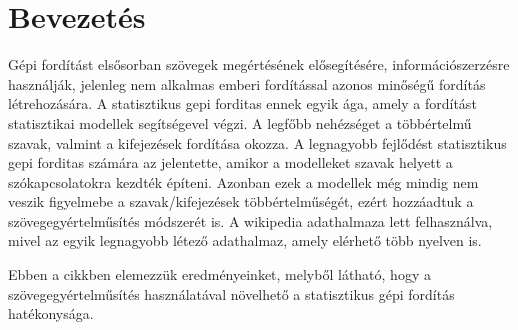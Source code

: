 \section{Bevezetés}
Gépi fordítást elsősorban szövegek megértésének elősegítésére, információszerzésre használják, jelenleg nem alkalmas emberi fordítással azonos minőségű fordítás létrehozására. A statisztikus gepi forditas ennek egyik ága, amely a fordítást statisztikai modellek segítségevel végzi.
A legfőbb nehézséget a többértelmű szavak, valmint a kifejezések fordítása okozza.
A legnagyobb fejlődést  statisztikus gepi forditas számára az jelentette, amikor a modelleket szavak helyett a szókapcsolatokra kezdték építeni. Azonban ezek a modellek még mindig nem veszik figyelmebe a szavak/kifejezések többértelműségét, ezért hozzáadtuk a szövegegyértelműsítés módszerét is. A wikipedia adathalmaza lett felhasználva, mivel az egyik legnagyobb létező adathalmaz, amely elérhető több nyelven is. 

Ebben a cikkben elemezzük eredményeinket, melyből látható, hogy a szövegegyértelműsítés használatával növelhető a statisztikus gépi fordítás hatékonysága.